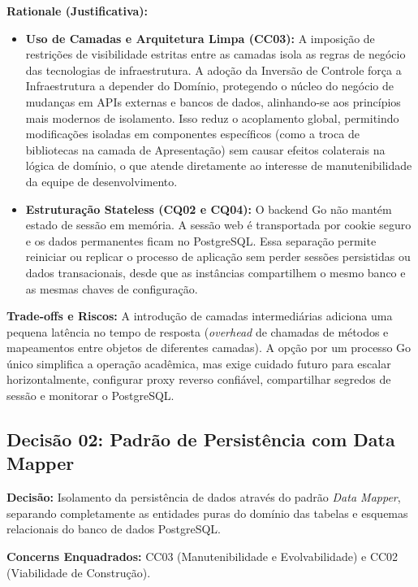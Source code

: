 \documentclass[12pt, a4paper]{article}
\begin{document}
\vspace{0.3cm}
\noindent\textbf{Rationale (Justificativa):} 
\begin{itemize}
    \item \textbf{Uso de Camadas e Arquitetura Limpa (CC03):} A imposição de restrições de visibilidade estritas entre as camadas isola as regras de negócio das tecnologias de infraestrutura. A adoção da Inversão de Controle força a Infraestrutura a depender do Domínio, protegendo o núcleo do negócio de mudanças em APIs externas e bancos de dados, alinhando-se aos princípios mais modernos de isolamento. Isso reduz o acoplamento global, permitindo modificações isoladas em componentes específicos (como a troca de bibliotecas na camada de Apresentação) sem causar efeitos colaterais na lógica de domínio, o que atende diretamente ao interesse de manutenibilidade da equipe de desenvolvimento.
    \item \textbf{Estruturação Stateless (CQ02 e CQ04):} O backend Go não mantém estado de sessão em memória. A sessão web é transportada por cookie seguro e os dados permanentes ficam no PostgreSQL. Essa separação permite reiniciar ou replicar o processo de aplicação sem perder sessões persistidas ou dados transacionais, desde que as instâncias compartilhem o mesmo banco e as mesmas chaves de configuração.
\end{itemize}

\noindent\textbf{Trade-offs e Riscos:} A introdução de camadas intermediárias adiciona uma pequena latência no tempo de resposta (\textit{overhead} de chamadas de métodos e mapeamentos entre objetos de diferentes camadas). A opção por um processo Go único simplifica a operação acadêmica, mas exige cuidado futuro para escalar horizontalmente, configurar proxy reverso confiável, compartilhar segredos de sessão e monitorar o PostgreSQL.

\subsection{Decisão 02: Padrão de Persistência com Data Mapper}

\noindent\textbf{Decisão:} Isolamento da persistência de dados através do padrão \textit{Data Mapper}, separando completamente as entidades puras do domínio das tabelas e esquemas relacionais do banco de dados PostgreSQL.

\vspace{0.3cm}
\noindent\textbf{Concerns Enquadrados:} CC03 (Manutenibilidade e Evolvabilidade) e CC02 (Viabilidade de Construção).
\end{document}
